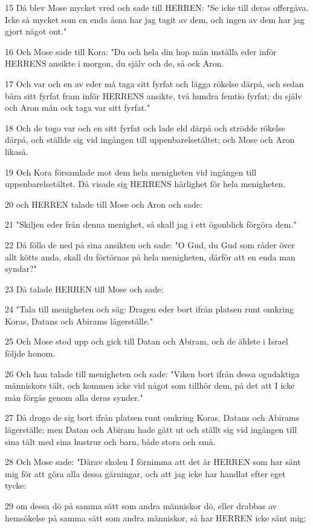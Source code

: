 \par 15 Då blev Mose mycket vred och sade till HERREN: "Se icke till deras offergåva. Icke så mycket som en enda åsna har jag tagit av dem, och ingen av dem har jag gjort något ont."
\par 16 Och Mose sade till Kora: "Du och hela din hop mån inställa eder inför HERRENS ansikte i morgon, du själv och de, så ock Aron.
\par 17 Och var och en av eder må taga sitt fyrfat och lägga rökelse därpå, och sedan bära sitt fyrfat fram inför HERRENS ansikte, två hundra femtio fyrfat; du själv och Aron mån ock taga var sitt fyrfat."
\par 18 Och de togo var och en sitt fyrfat och lade eld därpå och strödde rökelse därpå, och ställde sig vid ingången till uppenbarelsetältet; och Mose och Aron likaså.
\par 19 Och Kora församlade mot dem hela menigheten vid ingången till uppenbarelsetältet. Då visade sig HERRENS härlighet för hela menigheten.
\par 20 och HERREN talade till Mose och Aron och sade:
\par 21 "Skiljen eder från denna menighet, så skall jag i ett ögonblick förgöra dem."
\par 22 Då föllo de ned på sina ansikten och sade: "O Gud, du Gud som råder över allt kötts anda, skall du förtörnas på hela menigheten, därför att en enda man syndar?"
\par 23 Då talade HERREN till Mose och sade:
\par 24 "Tala till menigheten och säg: Dragen eder bort ifrån platsen runt omkring Koras, Datans och Abirams lägerställe."
\par 25 Och Mose stod upp och gick till Datan och Abiram, och de äldste i Israel följde honom.
\par 26 Och han talade till menigheten och sade: "Viken bort ifrån dessa ogudaktiga människors tält, och kommen icke vid något som tillhör dem, på det att I icke mån förgås genom alla deras synder."
\par 27 Då drogo de sig bort ifrån platsen runt omkring Koras, Datans och Abirams lägerställe; men Datan och Abiram hade gått ut och ställt sig vid ingången till sina tält med sina hustrur och barn, både stora och små.
\par 28 Och Mose sade: "Därav skolen I förnimma att det är HERREN som har sänt mig för att göra alla dessa gärningar, och att jag icke har handlat efter eget tycke:
\par 29 om dessa dö på samma sätt som andra människor dö, eller drabbas av hemsökelse på samma sätt som andra människor, så har HERREN icke sänt mig;
